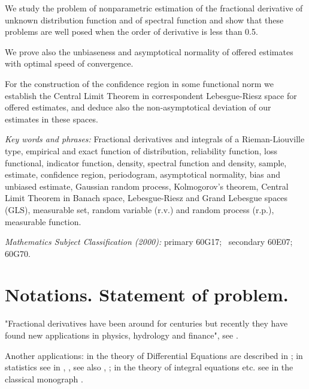  \vspace{3mm}

  We study the problem of nonparametric estimation of the fractional derivative of unknown distribution function
and of spectral function and show that these problems are well posed when the order of derivative is less than 0.5. \par
  We prove also the unbiaseness  and asymptotical normality of offered estimates with optimal speed of convergence.\par
   For the construction of the  confidence region  in some functional norm we establish the Central Limit Theorem in
 correspondent Lebesgue-Riesz space  for offered estimates, and deduce also the non-asymptotical deviation of our
 estimates in these spaces.  \par

 \vspace{4mm}

{\it Key words and phrases:} Fractional derivatives and integrals of a Rieman-Liouville type, empirical and exact function of
distribution, reliability function, loss functional, indicator function, density, spectral function and density,
sample, estimate, confidence region, periodogram,
asymptotical normality, bias  and unbiased estimate,  Gaussian random process, Kolmogorov's theorem, Central Limit Theorem
in Banach space, Lebesgue-Riesz and Grand Lebesgue spaces (GLS), measurable set, random variable (r.v.)
and random process (r.p.),  measurable function. \par

\vspace{3mm}

{\it Mathematics Subject Classification (2000):} primary 60G17; \ secondary 60E07; 60G70.\\

\vspace{4mm}

\section{Notations. Statement of problem.}

\vspace{4mm}

 "Fractional derivatives have been around for centuries  but recently they have
found new applications in physics, hydrology and finance", see  \cite{Meerschaert1}. \par
 Another applications: in the theory of Differential Equations are described in \cite{Miller1};
in statistics see in \cite{Adler1}, \cite{Bapna1}, see also \cite{Golubev1}, \cite{Enikeeva1}; in the theory of
integral equations etc. see in  the classical monograph \cite{Samko1}.  \par


